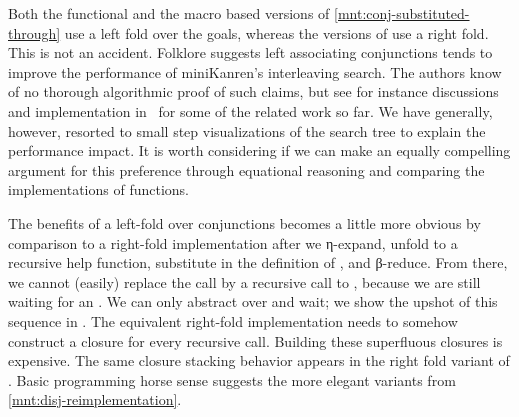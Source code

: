 \documentclass[sigplan,balance=true,pbalance=true,natbib=false]{acmart}
\begin{document}
Both the functional and the macro based versions of
\cref{mnt:conj-substituted-through} use a left fold over the goals,
whereas the versions of  use a right fold. This is
not an accident.
%
Folklore suggests left associating conjunctions tends to improve the
performance of miniKanren's interleaving search. The authors know of
no thorough algorithmic proof of such claims, but see for instance
discussions and implementation in~\cite{rosenblatt2019first} for some
of the related work so far. We have generally, however, resorted to
small step visualizations of the search tree to explain the
performance impact. It is worth considering if we can make an equally
compelling argument for this preference through equational reasoning
and comparing the implementations of functions.


The benefits of a left-fold over conjunctions becomes a little more
obvious by comparison to a right-fold implementation after we
η-expand, unfold to a recursive help function, substitute in the
definition of , and β-reduce. From there, we cannot
(easily) replace the  call by a recursive call
to , because we are still waiting for an .
We can only abstract over  and wait; we show the upshot
of this sequence in . The
equivalent right-fold implementation needs to somehow construct a
closure for every recursive call. Building these superfluous closures
is expensive. The same closure stacking behavior appears in the right
fold variant of . Basic programming horse sense
suggests the more elegant variants from
\cref{mnt:disj-reimplementation}.
\end{document}
